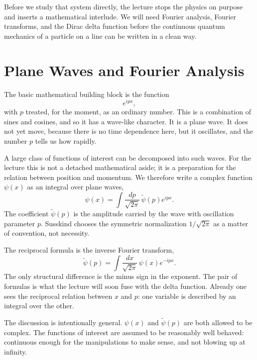 Before we study that system directly, the lecture stops the physics on purpose and inserts a mathematical interlude. We will need Fourier analysis, Fourier transforms, and the Dirac delta function before the continuous quantum mechanics of a particle on a line can be written in a clean way.

\section{Plane Waves and Fourier Analysis}

The basic mathematical building block is the function
\begin{equation}
e^{ipx},
\end{equation}
with $p$ treated, for the moment, as an ordinary number. This is a combination of sines and cosines, and so it has a wave-like character. It is a plane wave. It does not yet move, because there is no time dependence here, but it oscillates, and the number $p$ tells us how rapidly.

A large class of functions of interest can be decomposed into such waves. For the lecture this is not a detached mathematical aside; it is a preparation for the relation between position and momentum. We therefore write a complex function $\psi(x)$ as an integral over plane waves,
\begin{equation}
\psi(x)=\int \frac{dp}{\sqrt{2\pi}}\,\widetilde{\psi}(p)e^{ipx}.
\end{equation}
The coefficient $\widetilde{\psi}(p)$ is the amplitude carried by the wave with oscillation parameter $p$. Susskind chooses the symmetric normalization $1/\sqrt{2\pi}$ as a matter of convention, not necessity.

The reciprocal formula is the inverse Fourier transform,
\begin{equation}
\widetilde{\psi}(p)=\int \frac{dx}{\sqrt{2\pi}}\,\psi(x)e^{-ipx}.
\end{equation}
The only structural difference is the minus sign in the exponent. The pair of formulas is what the lecture will soon fuse with the delta function. Already one sees the reciprocal relation between $x$ and $p$: one variable is described by an integral over the other.

The discussion is intentionally general. $\psi(x)$ and $\widetilde{\psi}(p)$ are both allowed to be complex. The functions of interest are assumed to be reasonably well behaved: continuous enough for the manipulations to make sense, and not blowing up at infinity.

